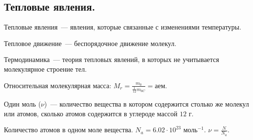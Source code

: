 \documentclass{article}
\begin{document}
	\subsection{Тепловые явления.}
	\begin{definition}
		Тепловые явления~--- явления, которые связанные с изменениями температуры.
	\end{definition}
	\begin{definition}
		Тепловое движение~--- беспорядочное движение молекул.
	\end{definition}
	\begin{definition}
		Термодинамика~--- теория тепловых явлений, в которых не учитывается молекулярное строение тел.
	\end{definition}
	\begin{definition}
		Относительная молекулярная масса: $M_r = \frac{m_0}{\frac{1}{12} m_{0C}} = \text{аем}$.
	\end{definition}
	\begin{definition}
		Один моль ($\nu$)~--- количество вещества в котором содержится столько же молекул или атомов, сколько атомов содержится в углероде массой $12$ г.
	\end{definition}
	\begin{definition}
		Количество атомов в одном моле вещества. $N_a = 6.02 \cdot 10^{23} \text{ моль}^{-1}$. $\nu = \frac{N}{N_a}$.
	\end{definition}
\end{document}
